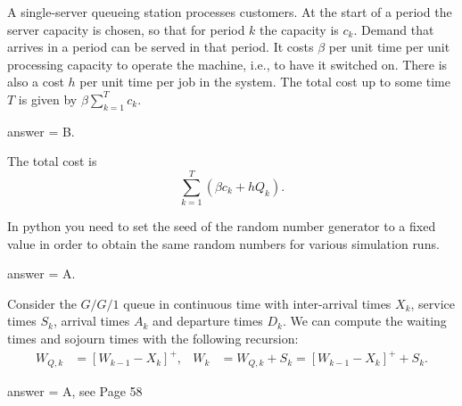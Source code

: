 \begin{exercise}[201903]
  A single-server queueing station processes customers.
  At the start of a period the server capacity is chosen, so that for period $k$ the capacity is $c_k$.
  Demand that arrives in a period can be served in that period.
  It costs $\beta$ per unit time per unit processing capacity to operate the machine, i.e., to have it switched on.
  There is also a cost $h$ per unit time per job in the system.
  The total cost up to some time $T$ is given by  $\beta \sum_{k=1}^T c_k$.
\begin{solution}
answer = B.

The total cost is
    \begin{equation*}
      \sum_{k=1}^T \left(\beta c_k + h Q_k\right).
    \end{equation*}

\end{solution}
\end{exercise}

\begin{exercise}[201903]
In python you need to set the seed of the random number generator to a fixed value in order to obtain the same random numbers for various simulation runs. 
\begin{solution}
answer = A.
\end{solution}
\end{exercise}

\begin{exercise}[201903]
Consider the $G/G/1$ queue in continuous time with inter-arrival times $X_k$, service times $S_k$, arrival times $A_k$ and departure times $D_k$. We can compute the waiting times and sojourn times with the following recursion:
\begin{align}
  W_{Q,k} &= [W_{k-1} - X_k]^+, &
  W_{k} &= W_{Q,k} + S_k = [W_{k-1} - X_k]^+ + S_k.
\end{align}

\begin{solution}
answer = A, see Page 58
\end{solution}
\end{exercise}



